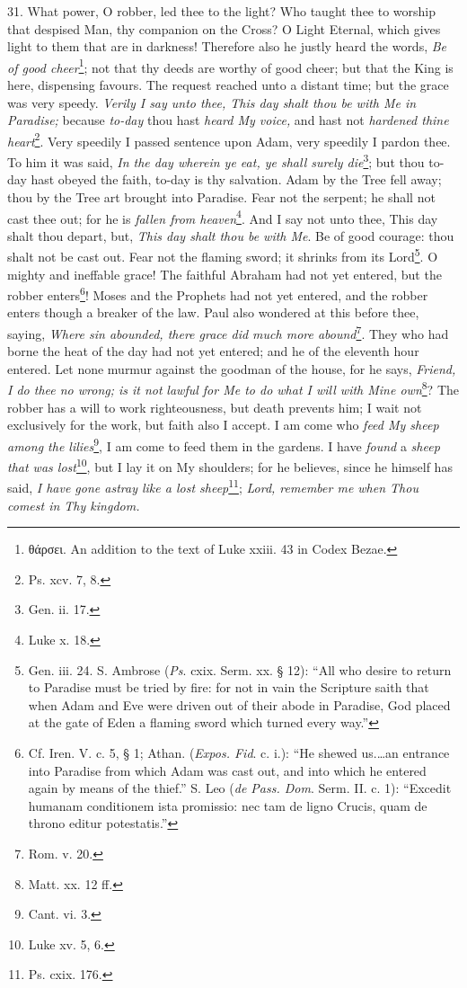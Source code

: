31. What power, O robber, led thee to the light? Who taught thee to worship that despised Man, thy companion on the Cross? O Light Eternal, which gives light to them that are in darkness! Therefore also he justly heard the words, \emph{Be of good cheer}\footnote{\textgreek{θάρσει}. An addition to the text of Luke xxiii. 43 in Codex Bezae.}; not that thy deeds are worthy of good cheer; but that the King is here, dispensing favours. The request reached unto a distant time; but the grace was very speedy. \emph{Verily I say unto thee, This day shalt thou be with Me in Paradise;} because \emph{to-day} thou hast \emph{heard My voice,} and hast not \emph{hardened thine heart}\footnote{Ps. xcv. 7, 8.}. Very speedily I passed sentence upon Adam, very speedily I pardon thee. To him it was said, \emph{In the day wherein ye eat, ye shall surely die}\footnote{Gen. ii. 17.}; but thou to-day hast obeyed the faith, to-day is thy salvation. Adam by the Tree fell away; thou by the Tree art brought into Paradise. Fear not the serpent; he shall not cast thee out; for he is \emph{fallen from heaven}\footnote{Luke x. 18.}. And I say not unto thee, This day shalt thou depart, but, \emph{This day shalt thou be with Me}. Be of good courage: thou shalt not be cast out. Fear not the flaming sword; it shrinks from its Lord\footnote{Gen. iii. 24. S. Ambrose (\emph{Ps}. cxix. Serm. xx. § 12): “All who desire to return to Paradise must be tried by fire: for not in vain the Scripture saith that when Adam and Eve were driven out of their abode in Paradise, God placed at the gate of Eden a flaming sword which turned every way.”}. O mighty and ineffable grace! The faithful Abraham had not yet entered, but the robber enters\footnote{Cf. Iren. V. c. 5, § 1; Athan. (\emph{Expos. Fid}. c. i.): “He shewed us.…an entrance into Paradise from which Adam was cast out, and into which he entered again by means of the thief.” S. Leo (\emph{de Pass. Dom}. Serm. II. c. 1): “Excedit humanam conditionem ista promissio: nec tam de ligno Crucis, quam de throno editur potestatis.”}! Moses and the Prophets had not yet entered, and the robber enters though a breaker of the law. Paul also wondered at this before thee, saying, \emph{Where sin abounded, there grace did much more abound}\footnote{Rom. v. 20.}. They who had borne the heat of the day had not yet entered; and he of the eleventh hour entered. Let none murmur against the goodman of the house, for he says, \emph{Friend, I do thee no wrong; is it not} \emph{lawful for Me to do what I will with Mine own}\footnote{Matt. xx. 12 ff.}? The robber has a will to work righteousness, but death prevents him; I wait not exclusively for the work, but faith also I accept. I am come who \emph{feed My sheep among the lilies}\footnote{Cant. vi. 3.}, I am come to feed them in the gardens. I have \emph{found} a \emph{sheep that was lost}\footnote{Luke xv. 5, 6.}, but I lay it on My shoulders; for he believes, since he himself has said, \emph{I have gone astray like a lost sheep}\footnote{Ps. cxix. 176.}; \emph{Lord, remember me when Thou comest in Thy kingdom.}

